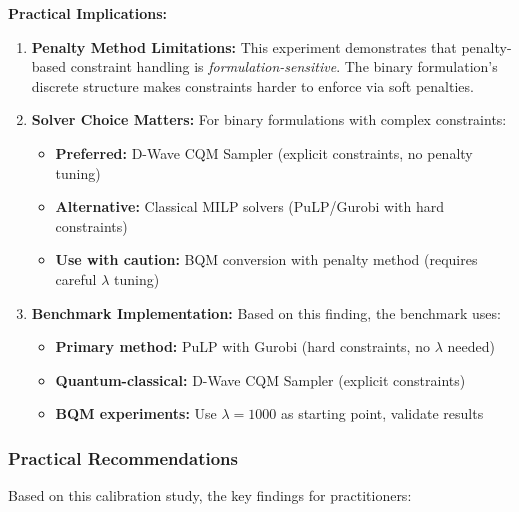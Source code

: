 \documentclass{article}
\begin{document}
\textbf{Practical Implications:}

\begin{enumerate}
    \item \textbf{Penalty Method Limitations:} This experiment demonstrates that penalty-based constraint handling is \textit{formulation-sensitive}. The binary formulation's discrete structure makes constraints harder to enforce via soft penalties.
    
    \item \textbf{Solver Choice Matters:} For binary formulations with complex constraints:
    \begin{itemize}
        \item \textbf{Preferred:} D-Wave CQM Sampler (explicit constraints, no penalty tuning)
        \item \textbf{Alternative:} Classical MILP solvers (PuLP/Gurobi with hard constraints)
        \item \textbf{Use with caution:} BQM conversion with penalty method (requires careful $\lambda$ tuning)
    \end{itemize}
    
    \item \textbf{Benchmark Implementation:} Based on this finding, the benchmark uses:
    \begin{itemize}
        \item \textbf{Primary method:} PuLP with Gurobi (hard constraints, no $\lambda$ needed)
        \item \textbf{Quantum-classical:} D-Wave CQM Sampler (explicit constraints)
        \item \textbf{BQM experiments:} Use $\lambda = 1000$ as starting point, validate results
    \end{itemize}
\end{enumerate}

\subsubsection{Practical Recommendations}

Based on this calibration study, the key findings for practitioners:
\end{document}
